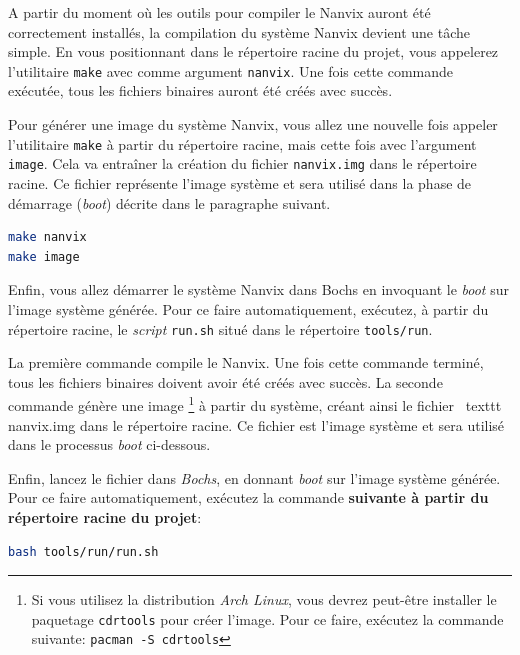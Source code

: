 \documentclass[11pt]{article}
\begin{document}
A partir du moment où les outils pour compiler le Nanvix auront été
correctement installés, la compilation du système Nanvix devient une
tâche simple. En vous positionnant dans le répertoire racine du
projet, vous appelerez l'utilitaire \texttt {make} avec comme argument
\texttt {nanvix}. Une fois cette commande exécutée, tous les fichiers
binaires auront été créés avec succès.

Pour générer une image du système Nanvix, vous allez une nouvelle fois
appeler l'utilitaire \texttt {make} à partir du répertoire racine,
mais cette fois avec l'argument \texttt {image}. Cela va entraîner la
création du fichier \texttt {nanvix.img} dans le répertoire racine. Ce
fichier représente l'image système et sera utilisé dans la phase de
démarrage (\textit {boot}) décrite dans le paragraphe suivant.

\begin{lstlisting}[language=bash,numbers=none,frame=single]
make nanvix
make image
\end{lstlisting}

Enfin, vous allez démarrer le système Nanvix dans Bochs en invoquant
le \textit {boot} sur l'image système générée. Pour ce faire
automatiquement, exécutez, à partir du répertoire racine, le \textit
{script} \texttt {run.sh} situé dans le répertoire \texttt
{tools/run}.

\vspace{0.3cm}

La première commande compile le Nanvix. Une fois cette
commande terminé, tous les fichiers binaires doivent avoir été créés
avec succès. La seconde commande génère une image \footnote {Si vous
  utilisez la distribution \textit {Arch Linux}, vous devrez peut-être
  installer le paquetage \texttt {cdrtools} pour créer l'image. Pour
  ce faire, exécutez la commande suivante: \texttt {pacman -S
    cdrtools}} à partir du système, créant ainsi le fichier \ texttt
{nanvix.img} dans le répertoire racine. Ce fichier est l'image système
et sera utilisé dans le processus \textit {boot} ci-dessous.

Enfin, lancez le fichier dans \textit {Bochs}, en donnant \textit {boot} sur l'image système générée.
Pour ce faire automatiquement, exécutez la commande \textbf {suivante à partir du répertoire racine du projet}:
\\

\begin{lstlisting}[language=bash,numbers=none,frame=single]
bash tools/run/run.sh
\end{lstlisting}
\end{document}
